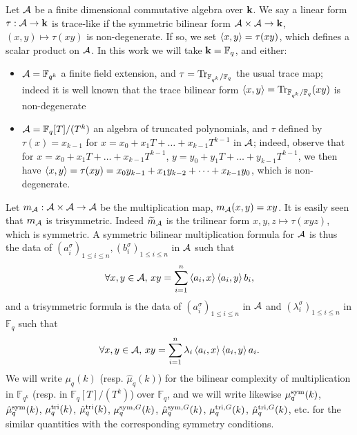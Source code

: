 \documentclass[11pt]{article}
\begin{document}
Let $\mathcal{A}$ be a finite dimensional commutative algebra over $\mathbf{k}$.
We say a linear form $\tau:\mathcal{A}\to\mathbf{k}$ is trace-like if the symmetric bilinear form $\mathcal{A}\times\mathcal{A}\to\mathbf{k}$, $(x,y)\mapsto\tau(xy)$ is non-degenerate.
If so, we set $\left\langle x,y\right\rangle=\tau(xy)$, which defines a scalar product on $\mathcal{A}$.
In this work we will take $\mathbf{k}=\mathbb{F}_q$, and either:
\begin{itemize}
\item $\mathcal{A}=\mathbb{F}_{q^k}$ a finite field extension, and $\tau=\operatorname{Tr}_{\mathbb{F}_{q^k}/\mathbb{F}_q}$ the usual trace map; indeed it is well known that the trace bilinear form $\left\langle x,y\right\rangle=\operatorname{Tr}_{\mathbb{F}_{q^k}/\mathbb{F}_q}(xy)$ is non-degenerate
\item $\mathcal{A}=\mathbb{F}_q[T]/(T^k)$ an algebra of truncated polynomials,
and $\tau$ defined by $\tau(x)=x_{k-1}$ for $x=x_0+x_1T+\dots+x_{k-1}T^{k-1}$ in $\mathcal{A}$;
indeed, observe that for $x=x_0+x_1T+\dots+x_{k-1}T^{k-1}$, $y=y_0+y_1T+\dots+y_{k-1}T^{k-1}$,
we then have $\left\langle x,y\right\rangle=\tau(xy)=x_0y_{k-1}+x_1y_{k-2}+\dots+x_{k-1}y_0$, which is non-degenerate.
\end{itemize}
Let $m_{\mathcal{A}}:\mathcal{A}\times\mathcal{A}\to\mathcal{A}$ be the multiplication map, $m_{\mathcal{A}}(x,y)=xy$.
It is easily seen that $m_{\mathcal{A}}$ is trisymmetric.
Indeed $\widetilde{m}_{\mathcal{A}}$ is the trilinear form $x,y,z\mapsto \tau(xyz)$,
which is symmetric.
A symmetric bilinear multiplication formula for $\mathcal{A}$ is thus the data
of $(a_i^\sigma)_{1\leq i\leq n},(b_i^\sigma)_{1\leq i\leq n}$ in $\mathcal{A}$ such that
\begin{equation}
\forall x, y\in\mathcal{A},\,xy = \sum_{i=1}^{n}\left\langle a_i,x\right\rangle\left\langle a_i,y\right\rangle b_i,
\label{eq:sym-tr}
\end{equation}
and a trisymmetric formula is the data of $(a_i^\sigma)_{1\leq i\leq n}$ in $\mathcal{A}$
and $(\lambda_i^\sigma)_{1\leq i\leq n}$ in $\mathbb{F}_q$ such that
\begin{equation}
\forall x, y\in\mathcal{A},\,xy = \sum_{i=1}^{n}\lambda_i\left\langle a_i,x\right\rangle\left\langle a_i,y\right\rangle a_i.
\label{eq:tri-sym}
\end{equation}
We will write $\mu_q(k)$ (resp. $\hat\mu_q(k)$) for the bilinear complexity of multiplication in $\mathbb{F}_{q^k}$ (resp. in $\mathbb{F}_q[T]/(T^k)$) over $\mathbb{F}_q$,
and we will write likewise $\mu^{\textrm{sym}}_q(k)$, $\hat\mu^{\textrm{sym}}_q(k)$, $\mu^{\textrm{tri}}_q(k)$, $\hat\mu^{\textrm{tri}}_q(k)$, $\mu^{\textrm{sym},G}_q(k)$, $\hat\mu^{\textrm{sym},G}_q(k)$, $\mu^{\textrm{tri},G}_q(k)$, $\hat\mu^{\textrm{tri},G}_q(k)$, etc.
for the similar quantities with the corresponding symmetry conditions.


\end{document}
